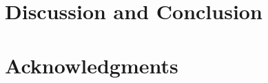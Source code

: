 \documentclass[preprint,11pt,3p]{elsarticle} %
\begin{document}
\section{Discussion and Conclusion}
\label{ch:conclusion}


\section{Acknowledgments}
\label{ch:acknowledgments}


%  


\clearpage %
   
  
\end{document}
